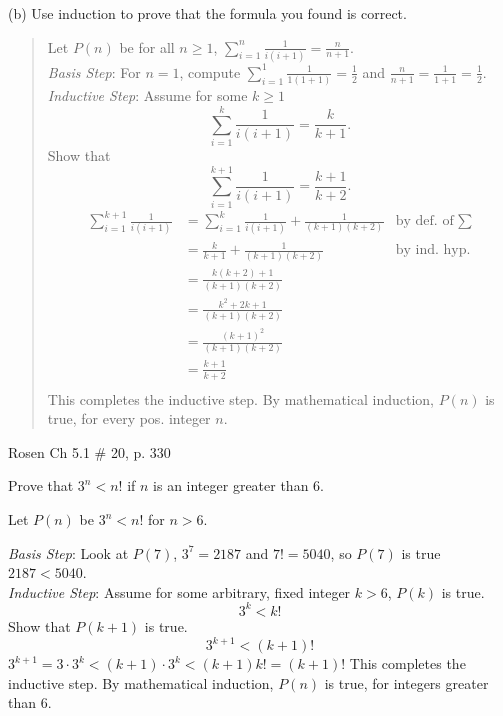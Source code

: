 \documentclass[12pt,addpoints]{exam}
\begin{document}
\begin{questions}
\begin{solution}
(b) Use induction to prove that the formula you found is correct.\\
\begin{quote}
Let $P(n)$ be for all $n \geq 1$, $\displaystyle \sum_{i=1}^n \frac{1}{i(i+1)} =  \frac{n}{n+1}.$ \\
\textit{Basis Step}: For $n=1$, compute $\sum_{i=1}^1 \frac{1}{1(1+1)} = \frac{1}{2}$ and $\frac{n}{n+1} = \frac{1}{1+1} = \frac{1}{2}$.  \\
\textit{Inductive Step}: Assume for some $k \geq 1$
 \[ \sum_{i=1}^k \frac{1}{i(i+1)} = \frac{k}{k+1}. \]
 Show that
 \[ \sum_{i=1}^{k+1} \frac{1}{i(i+1)} = \frac{k+1}{k+2}. \]
 \begin{align*}
    \sum_{i=1}^{k+1} \frac{1}{i(i+1)} &= \sum_{i=1}^k \frac{1}{i(i+1)}  + \frac{1}{(k+1)(k+2)}  & \text{by def. of}\; \sum \\
      &= \frac{k}{k+1} + \frac{1}{(k+1)(k+2)}  & \text{by ind. hyp.} \\
      &= \frac{k(k+2) + 1}{(k+1)(k+2)} \\
      &= \frac{k^2 + 2k + 1}{(k+1)(k+2)} \\
      &= \frac{(k+1)^2}{(k+1)(k+2)} \\
      &= \frac{k+1}{k+2} \\
 \end{align*}
 This completes the inductive step.  By mathematical induction, $P(n)$ is true, for every pos. integer $n$.
\end{quote}
\end{solution}


\question Rosen Ch 5.1 \# 20, p. 330
    \ifprintanswers
        \vspace{-10pt}
   \fi
\begin{solution}
Prove that $3^n < n!$ if $n$ is an integer greater than 6.

\smallskip
    Let $P(n)$ be $3^n < n!$ for $n > 6$.

    \textit{Basis Step}: Look at $P(7)$, $3^7 = 2187$ and $7! = 5040$, so $P(7)$ is true $2187 < 5040$. \\

    \textit{Inductive Step}:  Assume for some arbitrary, fixed integer $k > 6$, $P(k)$ is true.
    \[ 3^k < k! \]
    Show that $P(k+1)$ is true.
    \[ 3^{k+1} < (k+1)! \]
    $3^{k+1} = 3 \cdot 3^{k} < (k+1) \cdot 3^k < (k+1)k! = (k+1)!$
    This completes the inductive step.  By mathematical induction, $P(n)$ is true, for integers greater than 6.
\end{solution}



\end{questions}
\end{document}
